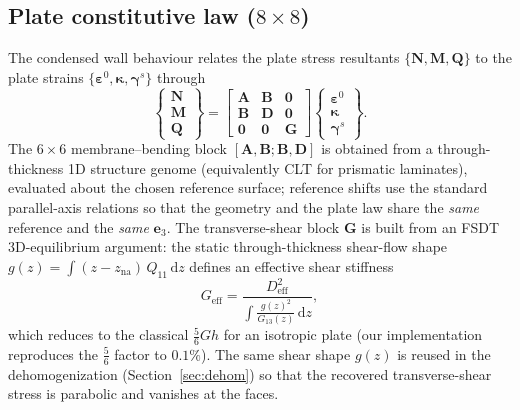 \documentclass[preprint,12pt]{elsarticle}
\newcommand{\bG}{\mathbf{G}}
\newcommand{\bvarepsilon}{\bm{\varepsilon}}
\begin{document}
\subsection{Plate constitutive law ($8\times8$)}
The condensed wall behaviour relates the plate stress resultants
$\{\bm{N},\bm{M},\bm{Q}\}$ to the plate strains
$\{\bvarepsilon^{0},\bm{\kappa},\bm{\gamma}^{s}\}$ through
\begin{equation}
\begin{Bmatrix}\bm{N}\\ \bm{M}\\ \bm{Q}\end{Bmatrix}
=\begin{bmatrix} \mathbf{A} & \mathbf{B} & \mathbf{0}\\
                 \mathbf{B} & \mathbf{D} & \mathbf{0}\\
                 \mathbf{0} & \mathbf{0} & \bG \end{bmatrix}
\begin{Bmatrix}\bvarepsilon^{0}\\ \bm{\kappa}\\ \bm{\gamma}^{s}\end{Bmatrix}.
\label{eq:plate8x8}
\end{equation}
The $6\times6$ membrane--bending block $[\mathbf{A},\mathbf{B};\mathbf{B},
\mathbf{D}]$ is obtained from a through-thickness 1D structure genome
(equivalently CLT for prismatic laminates), evaluated about the chosen
reference surface; reference shifts use the standard parallel-axis relations so
that the geometry and the plate law share the \emph{same} reference and the
\emph{same} $\bm{e}_3$. The transverse-shear block $\bG$ is built from an FSDT
3D-equilibrium argument: the static through-thickness shear-flow shape
$g(z)=\int (z-z_{\mathrm{na}})\,Q_{11}\,\mathrm{d}z$ defines an effective shear
stiffness
\begin{equation}
G_{\text{eff}}=\frac{D_{\text{eff}}^{2}}{\displaystyle\int \frac{g(z)^2}{G_{13}(z)}\,\mathrm{d}z},
\label{eq:Geff}
\end{equation}
which reduces to the classical $\tfrac{5}{6}Gh$ for an isotropic plate (our
implementation reproduces the $\tfrac56$ factor to $0.1\%$). The same shear
shape $g(z)$ is reused in the dehomogenization (Section~\ref{sec:dehom}) so that
the recovered transverse-shear stress is parabolic and vanishes at the faces.
\end{document}
